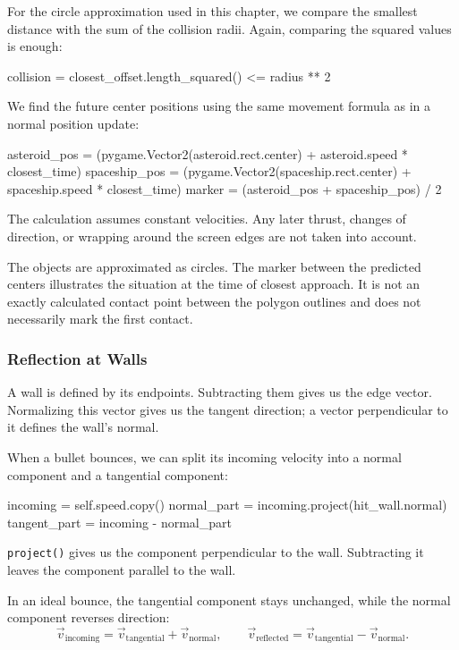 For the circle approximation used in this chapter, we compare the smallest distance with the sum of the collision radii. Again, comparing the squared values is enough:
\begin{codebox}
	collision = closest_offset.length_squared() <= radius ** 2
\end{codebox}

We find the future center positions using the same movement formula as in a normal position update:
\begin{codebox}
asteroid_pos = (pygame.Vector2(asteroid.rect.center) + asteroid.speed * closest_time)
spaceship_pos = (pygame.Vector2(spaceship.rect.center) + spaceship.speed * closest_time)
marker = (asteroid_pos + spaceship_pos) / 2
\end{codebox}

\begin{hintbox}
	The calculation assumes constant velocities. Any later thrust, changes of direction, or wrapping around the screen edges are not taken into account.
	
	The objects are approximated as circles. The marker between the predicted centers illustrates the situation at the time of closest approach. It is not an exactly calculated contact point between the polygon outlines and does not necessarily mark	the first contact.
\end{hintbox}

\newpage
\subsubsection*{Reflection at Walls}

A wall is defined by its endpoints. Subtracting them gives us the edge vector. Normalizing this vector gives us the tangent direction; a vector perpendicular to it defines the wall's normal.

When a bullet bounces, we can split its incoming velocity into a normal component and a tangential component:
\begin{codebox}
incoming = self.speed.copy()
normal_part = incoming.project(hit_wall.normal)
tangent_part = incoming - normal_part
\end{codebox}

\texttt{project()} gives us the component perpendicular to the wall. Subtracting it leaves the component parallel to the wall.

In an ideal bounce, the tangential component stays unchanged, while the normal component reverses direction:
\[
\vec v_{\mathrm{incoming}}
=
\vec v_{\mathrm{tangential}}
+
\vec v_{\mathrm{normal}},
\qquad
\vec v_{\mathrm{reflected}}
=
\vec v_{\mathrm{tangential}}
-
\vec v_{\mathrm{normal}}.
\]

